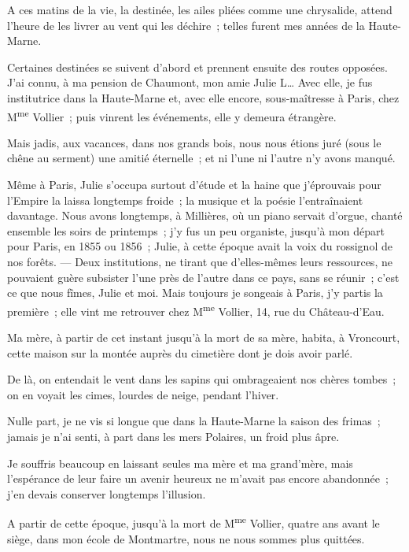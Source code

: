 \documentclass[french,twoside]{book} %
\newcommand\chaptercont{} %
\begin{document}
\chaptercont
\noindent A ces matins de la vie, la destinée, les ailes pliées comme une chrysalide, attend l’heure de les livrer au vent qui les déchire ; telles furent mes années de la Haute-Marne.\par
Certaines destinées se suivent d’abord et prennent ensuite des routes opposées. J’ai connu, à ma pension de Chaumont, mon amie Julie L… Avec elle, je fus institutrice dans la Haute-Marne et, avec elle encore, sous-maîtresse à Paris, chez M\textsuperscript{me} Vollier ; puis vinrent les événements, elle y demeura étrangère.\par
Mais jadis, aux vacances, dans nos grands bois, nous nous étions juré (sous le chêne au serment) une amitié éternelle ; et ni l’une ni l’autre n’y avons manqué.\par
Même à Paris, Julie s’occupa surtout d’étude et la haine que j’éprouvais pour l’Empire la laissa longtemps froide ; la musique et la poésie l’entraînaient davantage. Nous avons longtemps, à  Millières, où un piano servait d’orgue, chanté ensemble les soirs de printemps ; j’y fus un peu organiste, jusqu’à mon départ pour Paris, en 1855 ou 1856 ; Julie, à cette époque avait la voix du rossignol de nos forêts. — Deux institutions, ne tirant que d’elles-mêmes leurs ressources, ne pouvaient guère subsister l’une près de l’autre dans ce pays, sans se réunir ; c’est ce que nous fîmes, Julie et moi. Mais toujours je songeais à Paris, j’y partis la première ; elle vint me retrouver chez M\textsuperscript{me} Vollier, 14, rue du Château-d’Eau.\par
Ma mère, à partir de cet instant jusqu’à la mort de sa mère, habita, à Vroncourt, cette maison sur la montée auprès du cimetière dont je dois avoir parlé.\par
De là, on entendait le vent dans les sapins qui ombrageaient nos chères tombes ; on en voyait les cimes, lourdes de neige, pendant l’hiver.\par
Nulle part, je ne vis si longue que dans la Haute-Marne la saison des frimas ; jamais je n’ai senti, à part dans les mers Polaires, un froid plus âpre.\par
Je souffris beaucoup en laissant seules ma mère et ma grand’mère, mais l’espérance de leur faire un avenir heureux ne m’avait pas encore abandonnée ; j’en devais conserver longtemps l’illusion.\par
 A partir de cette époque, jusqu’à la mort de M\textsuperscript{me} Vollier, quatre ans avant le siège, dans mon école de Montmartre, nous ne nous sommes plus quittées.\par
\end{document}
